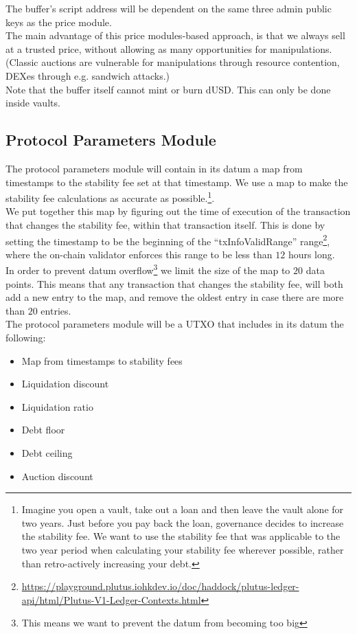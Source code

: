 \documentclass{article} %
\begin{document}
The buffer's script address will be dependent on the same three admin public
keys as the price module. \\

The main advantage of this price modules-based approach, is that we always sell
at a trusted price, without allowing as many opportunities for manipulations.
(Classic auctions are vulnerable for manipulations through resource contention,
DEXes through e.g. sandwich attacks.) \\

Note that the buffer itself cannot mint or burn dUSD. This can only be done
inside vaults.

\subsection{Protocol Parameters Module}

The protocol parameters module will contain in its datum a map from timestamps
to the stability fee set at that timestamp.
We use a map to make the stability fee calculations as accurate as
possible.\footnote{
  Imagine you open a vault, take out a loan and then leave the vault alone for
  two years.
  Just before you pay back the loan, governance decides to increase the
  stability fee.
  We want to use the stability fee that was applicable to the two year period
  when calculating your stability fee wherever possible, rather than
  retro-actively increasing your debt.
}. \\

We put together this map by figuring out the time of execution of the
transaction that changes the stability fee, within that transaction itself.
This is done by setting the timestamp to be the beginning of the
``txInfoValidRange'' range\footnote{
  \url{https://playground.plutus.iohkdev.io/doc/haddock/plutus-ledger-api/html/Plutus-V1-Ledger-Contexts.html}},
where the on-chain validator enforces this range to be less than $12$ hours
long. \\

In order to prevent datum overflow\footnote{
  This means we want to prevent the datum from becoming too big}
we limit the size of the map to $20$ data points.
This means that any transaction that changes the stability fee, will both add a
new entry to the map, and remove the oldest entry in case there are more than
$20$ entries. \\

The protocol parameters module will be a UTXO that includes in its datum the following:
\begin{itemize}
  \item Map from timestamps to stability fees
  \item Liquidation discount
  \item Liquidation ratio
  \item Debt floor
  \item Debt ceiling
  \item Auction discount
\end{itemize}
\end{document}
